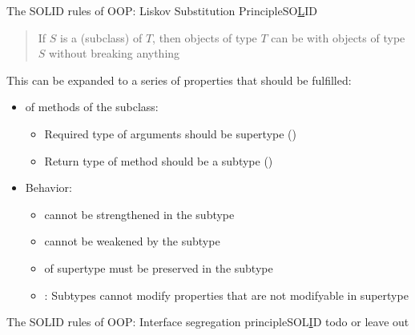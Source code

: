 \begin{frame}{The SOLID rules of OOP: Liskov Substitution Principle}{SO\underline  LID}
	\begin{quote}
		If $S$ is a  (subclass) of $T$, then objects of type $T$ can be  with objects of type $S$ without breaking anything
	\end{quote}
	This can be expanded to a series of properties that should be fulfilled:
	\begin{itemize}
		\item {} of methods of the subclass:
		\begin{itemize}
			\item 
			Required type of arguments should be supertype ()\\
			\item 
			Return type of method should be a subtype ()\\
		\end{itemize}
	\item Behavior:
		\begin{itemize}
		\item
		  cannot be strengthened in the subtype\\
		\item 
		 cannot be weakened by the subtype
		\item 
		  of supertype must be preserved in the subtype
		\item 
		: Subtypes cannot modify properties that are not modifyable in supertype\\
		\end{itemize}
	\end{itemize}
\end{frame}

\begin{frame}{The SOLID rules of OOP: Interface segregation principle}{SOL\underline  ID}
	todo or leave out 
\end{frame}

